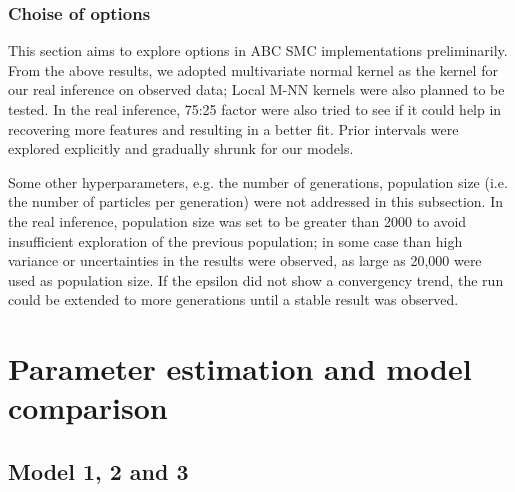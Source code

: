 

\subsubsection{Choise of options} 

This section aims to explore options in ABC SMC implementations preliminarily. From the above results, we adopted multivariate normal kernel as the kernel for our real inference on observed data; Local M-NN kernels were also planned to be tested. In the real inference, 75:25 factor were also tried to see if it could help in recovering more features and resulting in a better fit. Prior intervals were explored explicitly and gradually shrunk for our models.


Some other hyperparameters, e.g. the number of generations, population size (i.e. the number of particles per generation) were not addressed in this subsection. In the real inference, population size was set to be greater than 2000 to avoid insufficient exploration of the previous population; in some case than high variance or uncertainties in the results were observed, as large as 20,000 were used as population size. If the epsilon did not show a convergency trend, the run could be extended to more generations until a stable result was observed.









\section{Parameter estimation and model comparison}

\subsection{Model 1, 2 and 3}


